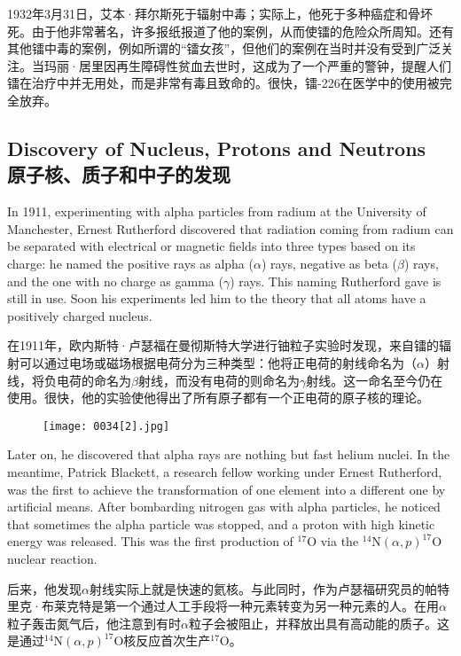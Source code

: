 \documentclass[dvipsnames, svgnames,a4paper,11pt]{article}
\begin{document}
1932年3月31日，艾本·拜尔斯死于辐射中毒；实际上，他死于多种癌症和骨坏死。由于他非常著名，许多报纸报道了他的案例，从而使镭的危险众所周知。还有其他镭中毒的案例，例如所谓的“镭女孩”，但他们的案例在当时并没有受到广泛关注。当玛丽·居里因再生障碍性贫血去世时，这成为了一个严重的警钟，提醒人们镭在治疗中并无用处，而是非常有毒且致命的。很快，镭-226在医学中的使用被完全放弃。

\subsection{Discovery of Nucleus, Protons and Neutrons\\原子核、质子和中子的发现}

In 1911, experimenting with alpha particles from radium at the University of Manchester, Ernest Rutherford discovered that radiation coming from radium can be separated with electrical or magnetic fields into three types based on its charge: he named the positive rays as alpha ($\alpha$) rays, negative as beta ($\beta$) rays, and the one with no charge as gamma ($\gamma$) rays. This naming Rutherford gave is still in use. Soon his experiments led him to the theory that all atoms have a positively charged nucleus.

在1911年，欧内斯特·卢瑟福在曼彻斯特大学进行铀粒子实验时发现，来自镭的辐射可以通过电场或磁场根据电荷分为三种类型：他将正电荷的射线命名为（$\alpha$）射线，将负电荷的命名为$\beta$射线，而没有电荷的则命名为$\gamma$射线。这一命名至今仍在使用。很快，他的实验使他得出了所有原子都有一个正电荷的原子核的理论。

\begin{figure}[htbp]
      \centering
      \texttt{[image: 0034[2].jpg]}
       \label{fig23}
\end{figure}


Later on, he discovered that alpha rays are nothing but fast helium nuclei. In the meantime, Patrick Blackett, a research fellow working under Ernest Rutherford, was the first to achieve the transformation of one element into a different one by artificial means. After bombarding nitrogen gas with alpha particles, he noticed that sometimes the alpha particle was stopped, and a proton with high kinetic energy was released. This was the first production of \(^{17}\text{O}\) via the \(^{14}\text{N} (\alpha, p)^{17}\text{O}\) nuclear reaction.

后来，他发现$\alpha$射线实际上就是快速的氦核。与此同时，作为卢瑟福研究员的帕特里克·布莱克特是第一个通过人工手段将一种元素转变为另一种元素的人。在用$\alpha$粒子轰击氮气后，他注意到有时$\alpha$粒子会被阻止，并释放出具有高动能的质子。这是通过\(^{14}\text{N} (\alpha, p)^{17}\text{O}\)核反应首次生产\(^{17}\text{O}\)。
\end{document}
